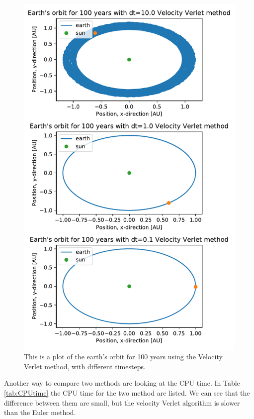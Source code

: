 \begin{figure}[H]
\includegraphics[width=0.9\linewidth]{../results/plots/different_timesteps_Velocity Verlet method.pdf}\caption{This is a plot of the earth's orbit for 100 years using the Velocity Verlet method, with different timesteps.}\label{fig:timesteps-verlet}
\end{figure}		

Another way to compare two methods are looking at the CPU time. In Table \ref{tab:CPUtime} the CPU time for the two method are listed. We can see that the difference between them are small, but the velocity Verlet algorithm is slower than the Euler method. 


